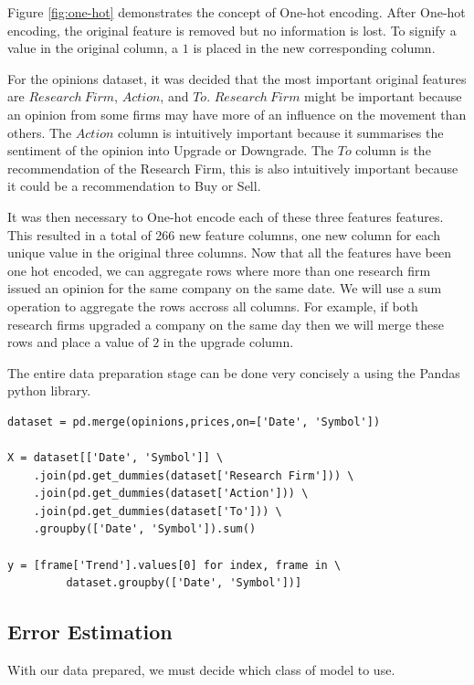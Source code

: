 \documentclass{report}
\begin{document}
Figure \ref{fig:one-hot} demonstrates the concept of One-hot encoding. After One-hot encoding, the original feature is removed but no information is lost. To signify a value in the original column, a $1$ is placed in the new corresponding column.

For the opinions dataset, it was decided that the most important original features are $Research\ Firm$, $Action$, and $To$. $Research\ Firm$ might be important because an opinion from some firms may have more of an influence on the movement than others. The $Action$ column is intuitively important because it summarises the sentiment of the opinion into Upgrade or Downgrade. The $To$ column is the recommendation of the Research Firm, this is also intuitively important because it could be a recommendation to Buy or Sell.

It was then necessary to One-hot encode each of these three features features. This resulted in a total of 266 new feature columns, one new column for each unique value in the original three columns. Now that all the features have been one hot encoded, we can aggregate rows where more than one research firm issued an opinion for the same company on the same date. We will use a sum operation to aggregate the rows accross all columns. For example, if both research firms upgraded a company on the same day then we will merge these rows and place a value of $2$ in the upgrade column.

The entire data preparation stage can be done very concisely a using the Pandas python library.

\begin{lstlisting}[frame=single, caption=Data Preparation Using Pandas]
dataset = pd.merge(opinions,prices,on=['Date', 'Symbol'])

X = dataset[['Date', 'Symbol']] \
    .join(pd.get_dummies(dataset['Research Firm'])) \
    .join(pd.get_dummies(dataset['Action'])) \
    .join(pd.get_dummies(dataset['To'])) \
    .groupby(['Date', 'Symbol']).sum() 
    
y = [frame['Trend'].values[0] for index, frame in \
         dataset.groupby(['Date', 'Symbol'])]
\end{lstlisting}

\subsection{Error Estimation}

With our data prepared, we must decide which class of model to use.
\end{document}

